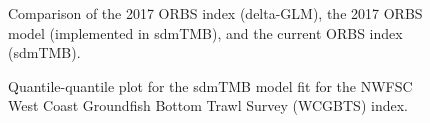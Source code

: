 \documentclass[
]{scrartcl}
\begin{document}
\clearpage

\begin{figure}


\caption{\label{fig-ORBS_comp}Comparison of the 2017 ORBS index
(delta-GLM), the 2017 ORBS model (implemented in sdmTMB), and the
current ORBS index (sdmTMB).}

\end{figure}%

\begin{figure}


\caption{\label{fig-wcgbts_qq}Quantile-quantile plot for the sdmTMB
model fit for the NWFSC West Coast Groundfish Bottom Trawl Survey
(WCGBTS) index.}

\end{figure}%
\end{document}
